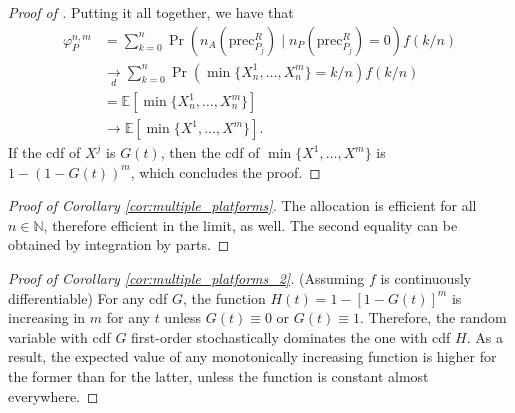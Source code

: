 \documentclass[a4paper]{article}
\newcommand{\E}{\mathbb{E}}
\newcommand{\precede}{\mathrm{prec}}
\begin{document}
\begin{proof}[Proof of ]
    Putting it all together, we have that
    \begin{align*}
        \varphi^{n, m}_P &= \sum_{k=0}^n \Pr(n_A(\precede^R_{P_j}) \mid n_P(\precede^R_{P_j}) = 0) f(k/n) \\
        &\xrightarrow[d]{} \sum_{k=0}^n \Pr(\min\{X_n^1, \dots, X_n^m\} = k/n) f(k/n) \\
        &= \E[\min\{X_n^1, \dots, X_n^m\}] \\
        &\to \E[\min\{X^1, \dots, X^m\}].
    \end{align*}
    If the cdf of $X^j$ is $G(t)$, then the cdf of $\min\{X^1, \dots, X^m\}$ is $1 - (1 - G(t))^m$, which concludes the proof.
\end{proof}

\begin{proof}[Proof of Corollary \ref{cor:multiple_platforms}]
    The allocation is efficient for all $n \in \mathbb{N}$, therefore efficient in the limit, as well.
    The second equality can be obtained by integration by parts.
\end{proof}

\begin{proof}[Proof of Corollary \ref{cor:multiple_platforms_2}] (Assuming $f$ is continuously differentiable) %
    For any cdf $G$, the function $H(t) = 1 - [1 - G(t)]^m$ is increasing in $m$ for any $t$ unless $G(t) \equiv 0$ or $G(t) \equiv 1$.
    Therefore, the random variable with cdf $G$ first-order stochastically dominates the one with cdf $H$.
    As a result, the expected value of any monotonically increasing function is higher for the former than for the latter, unless the function is constant almost everywhere.
\end{proof}
\end{document}
